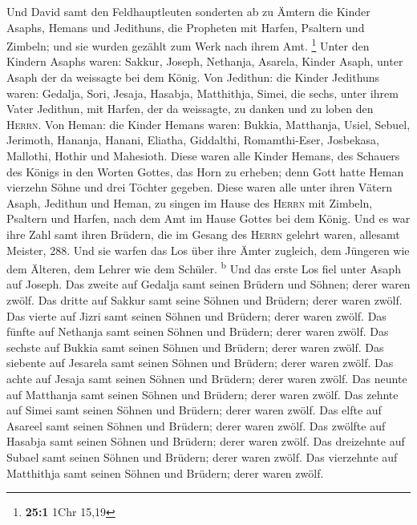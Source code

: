  Und David samt den Feldhauptleuten sonderten ab zu Ämtern
die Kinder Asaphs, Hemans und Jedithuns, die Propheten mit Harfen,
Psaltern und Zimbeln; und sie wurden gezählt zum Werk nach ihrem Amt.
\footnote{\textbf{25:1} 1Chr 15,19}  Unter den Kindern
Asaphs waren: Sakkur, Joseph, Nethanja, Asarela, Kinder Asaph, unter
Asaph der da weissagte bei dem König.  Von Jedithun: die
Kinder Jedithuns waren: Gedalja, Sori, Jesaja, Hasabja, Matthithja,
Simei, die sechs, unter ihrem Vater Jedithun, mit Harfen, der da
weissagte, zu danken und zu loben den \textsc{Herrn}.  Von
Heman: die Kinder Hemans waren: Bukkia, Matthanja, Usiel, Sebuel,
Jerimoth, Hananja, Hanani, Eliatha, Giddalthi, Romamthi-Eser, Josbekasa,
Mallothi, Hothir und Mahesioth.  Diese waren alle Kinder
Hemans, des Schauers des Königs in den Worten Gottes, das Horn zu
erheben; denn Gott hatte Heman vierzehn Söhne und drei Töchter gegeben.
 Diese waren alle unter ihren Vätern Asaph, Jedithun und
Heman, zu singen im Hause des \textsc{Herrn} mit Zimbeln, Psaltern und
Harfen, nach dem Amt im Hause Gottes bei dem König.  Und
es war ihre Zahl samt ihren Brüdern, die im Gesang des \textsc{Herrn}
gelehrt waren, allesamt Meister, 288.  Und sie warfen das
Los über ihre Ämter zugleich, dem Jüngeren wie dem Älteren, dem Lehrer
wie dem Schüler. \textsuperscript{b}  Und das erste Los
fiel unter Asaph auf Joseph. Das zweite auf Gedalja samt seinen Brüdern
und Söhnen; derer waren zwölf.  Das dritte auf Sakkur
samt seine Söhnen und Brüdern; derer waren zwölf.  Das
vierte auf Jizri samt seinen Söhnen und Brüdern; derer waren zwölf.
 Das fünfte auf Nethanja samt seinen Söhnen und Brüdern;
derer waren zwölf.  Das sechste auf Bukkia samt seinen
Söhnen und Brüdern; derer waren zwölf.  Das siebente auf
Jesarela samt seinen Söhnen und Brüdern; derer waren zwölf.
 Das achte auf Jesaja samt seinen Söhnen und Brüdern;
derer waren zwölf.  Das neunte auf Matthanja samt seinen
Söhnen und Brüdern; derer waren zwölf.  Das zehnte auf
Simei samt seinen Söhnen und Brüdern; derer waren zwölf. 
Das elfte auf Asareel samt seinen Söhnen und Brüdern; derer waren zwölf.
 Das zwölfte auf Hasabja samt seinen Söhnen und Brüdern;
derer waren zwölf.  Das dreizehnte auf Subael samt seinen
Söhnen und Brüdern; derer waren zwölf.  Das vierzehnte
auf Matthithja samt seinen Söhnen und Brüdern; derer waren zwölf.
